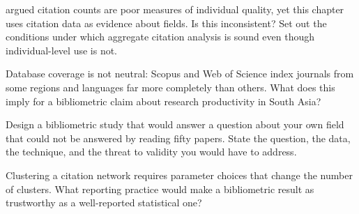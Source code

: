 \begin{reviewq}
  \item {} argued citation counts are poor measures of
    individual quality, yet this chapter uses citation data as evidence about
    fields. Is this inconsistent? Set out the conditions under which aggregate
    citation analysis is sound even though individual-level use is not.
  \item Database coverage is not neutral: Scopus and Web of Science index
    journals from some regions and languages far more completely than others.
    What does this imply for a bibliometric claim about research productivity
    in South Asia?
  \item Design a bibliometric study that would answer a question about your own
    field that could not be answered by reading fifty papers. State the
    question, the data, the technique, and the threat to validity you would
    have to address.
  \item Clustering a citation network requires parameter choices that change
    the number of clusters. What reporting practice would make a bibliometric
    result as trustworthy as a well-reported statistical one?
\end{reviewq}
